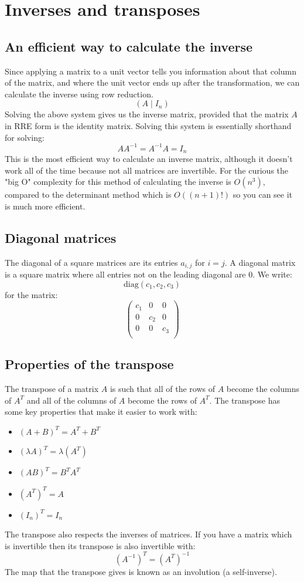 \documentclass[12pt]{article}
\begin{document}
\section{Inverses and transposes}
\subsection*{An efficient way to calculate the inverse}
Since applying a matrix to a unit vector tells you information about that column of the matrix, and where the unit vector ends up after the transformation, we can calculate the inverse using row reduction.
\[(A\mid I_n)\]
Solving the above system gives us the inverse matrix, provided that the matrix \(A\) in RRE form is the identity matrix. Solving this system is essentially shorthand for solving:
\[AA^{-1}=A^{-1}A=I_n\]
This is the most efficient way to calculate an inverse matrix, although it doesn't work all of the time because not all matrices are invertible. For the curious the "big O" complexity for this method of calculating the inverse is \(O(n^3)\), compared to the determinant method which is \(O((n+1)!)\) so you can see it is much more efficient.
\subsection*{Diagonal matrices}
The diagonal of a square matrices are its entries \(a_{i,j}\) for \(i=j\). A diagonal matrix is a square matrix where all entries not on the leading diagonal are 0. We write:
\[\text{diag}(c_1,c_2,c_3)\]
for the matrix:
\[\begin{pmatrix}
    c_1 & 0 & 0\\
    0 & c_2 & 0\\
    0 & 0 & c_3 \\
\end{pmatrix}\]
\subsection*{Properties of the transpose}
The transpose of a matrix \(A\) is such that all of the rows of \(A\) become the columns of \(A^T\) and all of the columns of \(A\) become the rows of \(A^T\). The transpose has some key properties that make it easier to work with:
\begin{itemize}
    \item \((A+B)^T=A^T+B^T\)
    \item \((\lambda A)^T=\lambda(A^T)\)
    \item \((AB)^T=B^TA^T\)
    \item \((A^T)^T=A\)
    \item \((I_n)^T=I_n\)
\end{itemize}
The transpose also respects the inverses of matrices. If you have a matrix which is invertible then its transpose is also invertible with:
\[(A^{-1})^T=(A^T)^{-1}\]
The map that the transpose gives is known as an involution (a self-inverse).
\end{document}
